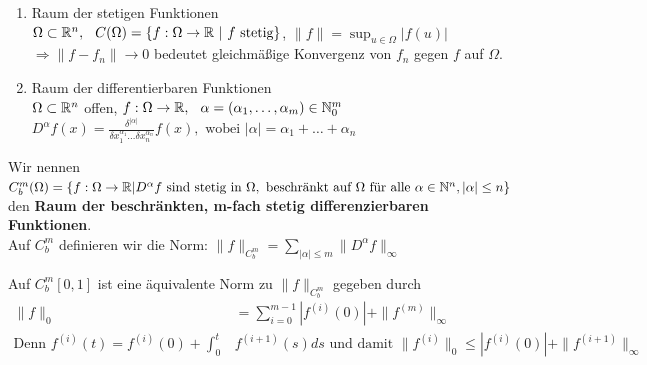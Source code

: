 \begin{beispiel}
	\begin{enumerate}[label=\alph*\upshape)]
		\item Raum der stetigen Funktionen \\
		$\Omega \subset \mathbb{R}^{n}, \hspace{0.25cm} C(\Omega) = \{ f: \Omega \rightarrow \mathbb{R} \text{ | } f \text{ stetig} \}$, \hspace{0.25cm} $\| f \| = \sup_{u \in \Omega} |f(u)|$\\
		$\Rightarrow \| f - f_{n} \| \rightarrow 0$ bedeutet gleichmä{\ss}ige Konvergenz von $f_{n}$ gegen $f$ auf $\Omega$.
		\item Raum der differentierbaren Funktionen \\
		$\Omega \subset \mathbb{R}^{n}$ offen, $f: \Omega \rightarrow \mathbb{R}, \hspace{0.25cm} \alpha = (\alpha_{1}, \dotsc, \alpha_{m}) \in \mathbb{N}_{0}^{m}$ \\
		$D^{\alpha}f(x) = \frac{ \delta^{ | \alpha | } }{ \delta x_{1}^{ \alpha_{1} } \dotsc \delta x_{n}^{ \alpha_{n} } } f(x), \text{ wobei } | \alpha | = \alpha_{1} + \dotsc + \alpha_{n} $ \\ 
	\end{enumerate}
\end{beispiel}

\begin{definition}
Wir nennen $C_{b}^{m}(\Omega) = \{ f: \Omega \rightarrow \mathbb{R} | D^{\alpha}f \text{ sind stetig in } \Omega, \text{ beschränkt auf } \Omega \text{ für alle } \alpha \in \mathbb{N}^{n}, |\alpha| \leq n \}$ den \textbf{Raum der beschränkten, m-fach stetig differenzierbaren Funktionen}.  \\
Auf $C_{b}^{m}$ definieren wir die Norm: $\| f \|_{C_{b}^{m}} = \sum_{|\alpha| \leq m} \| D^{\alpha}f \|_{\infty}$
\end{definition}

\begin{bemerkung}
Auf $C_{b}^{m} [0, 1]$ ist eine äquivalente Norm zu  $\| f \|_{C_{b}^{m}}$ gegeben durch
\begin{align*}
	\| f \|_{0} & = \sum_{i = 0}^{m - 1} |f^{(i)}(0)| + \| f^{(m)} \|_{\infty} \\
	\text{Denn } f^{(i)}(t) = f^{(i)}(0) + \int_{0}^{t} & f^{(i + 1)}(s) ds \text{ und damit } \| f^{(i)}\|_{0} \leq | f^{(i)}(0) | + \| f^{(i + 1)}\|_{\infty}	
\end{align*}
\end{bemerkung}

